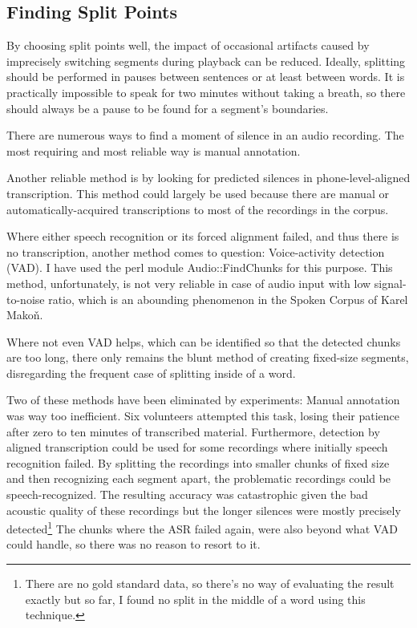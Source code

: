 \documentclass[conference]{IEEEtran}
\begin{document}
\subsection{Finding Split Points}

By choosing split points well, the impact of occasional artifacts caused by
imprecisely switching segments during playback can be reduced. Ideally,
splitting should be performed in pauses between sentences or at least between
words. It is practically impossible to speak for two minutes without taking a
breath, so there should always be a pause to be found for a segment's
boundaries.

There are numerous ways to find a moment of silence in an audio recording. The
most requiring and most reliable way is manual annotation.

Another reliable method is by looking for predicted silences in
phone-level-aligned transcription. This method could largely be used because there are
manual or automatically-acquired transcriptions to most of the recordings in the
corpus.

Where either speech recognition or its forced alignment failed, and thus there
is no transcription, another method comes to question: Voice-activity detection
(VAD).  I have used the perl module Audio::FindChunks for this purpose. This
method, unfortunately, is not very reliable in case of audio input with low
signal-to-noise ratio, which is an abounding phenomenon in the Spoken Corpus of
Karel Makoň.

Where not even VAD helps, which can be identified so that the detected chunks
are too long, there only remains the blunt method of creating fixed-size
segments, disregarding the frequent case of splitting inside of a word.

Two of these methods have been eliminated by experiments: Manual annotation was
way too inefficient. Six volunteers attempted this task, losing their patience
after zero to ten minutes of transcribed material. Furthermore, detection by aligned
transcription could be used for some recordings where initially speech
recognition failed. By splitting the recordings into smaller chunks of fixed
size and then
recognizing each segment apart, the problematic recordings could be
speech-recognized. The resulting accuracy was catastrophic given the bad
acoustic quality of these recordings but the
longer silences were mostly precisely detected\footnote{There are no gold
standard data, so there's no way of evaluating the result exactly but so far, I
found no split in the middle of a word using this technique.} The chunks where
the ASR failed again, were also beyond what VAD could handle, so there was no reason
to resort to it.
\end{document}

